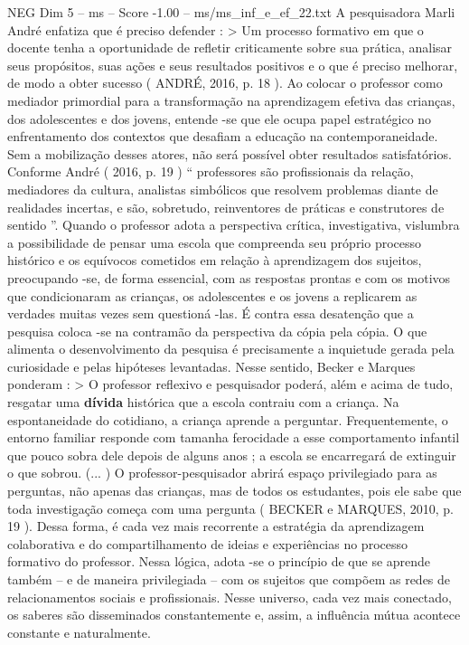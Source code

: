 \begin{textsample}{NEG Dim 5 – ms – Score -1.00 – ms/ms\_inf\_e\_ef\_22.txt}
A pesquisadora Marli André enfatiza que é preciso defender : > Um processo formativo em que o docente tenha a oportunidade de refletir criticamente sobre sua prática, analisar seus propósitos, suas ações e seus resultados positivos e o que é preciso melhorar, de modo a obter sucesso ( ANDRÉ, 2016, p. 18 ).
Ao colocar o professor como mediador primordial para a transformação na aprendizagem efetiva das crianças, dos adolescentes e dos jovens, entende -se que ele ocupa papel estratégico no enfrentamento dos contextos que desafiam a educação na contemporaneidade.
Sem a mobilização desses atores, não será possível obter resultados satisfatórios.
Conforme André ( 2016, p. 19 ) “ professores são profissionais da relação, mediadores da cultura, analistas simbólicos que resolvem problemas diante de realidades incertas, e são, sobretudo, reinventores de práticas e construtores de sentido ”.
Quando o professor adota a perspectiva crítica, investigativa, vislumbra a possibilidade de pensar uma escola que compreenda seu próprio processo histórico e os equívocos cometidos em relação à aprendizagem dos sujeitos, preocupando -se, de forma essencial, com as respostas prontas e com os motivos que condicionaram as crianças, os adolescentes e os jovens a replicarem as verdades muitas vezes sem questioná -las.
É contra essa desatenção que a pesquisa coloca -se na contramão da perspectiva da cópia pela cópia.
O que alimenta o desenvolvimento da pesquisa é precisamente a inquietude gerada pela curiosidade e pelas hipóteses levantadas.
Nesse sentido, Becker e Marques ponderam : > O professor reflexivo e pesquisador poderá, além e acima de tudo, resgatar uma \textbf{dívida} histórica que a escola contraiu com a criança.
Na espontaneidade do cotidiano, a criança aprende a perguntar.
Frequentemente, o entorno familiar responde com tamanha ferocidade a esse comportamento infantil que pouco sobra dele depois de alguns anos ; a escola se encarregará de extinguir o que sobrou. (... ) O professor-pesquisador abrirá espaço privilegiado para as perguntas, não apenas das crianças, mas de todos os estudantes, pois ele sabe que toda investigação começa com uma pergunta ( BECKER e MARQUES, 2010, p. 19 ).
Dessa forma, é cada vez mais recorrente a estratégia da aprendizagem colaborativa e do compartilhamento de ideias e experiências no processo formativo do professor.
Nessa lógica, adota -se o princípio de que se aprende também – e de maneira privilegiada – com os sujeitos que compõem as redes de relacionamentos sociais e profissionais.
Nesse universo, cada vez mais conectado, os saberes são disseminados constantemente e, assim, a influência mútua acontece constante e naturalmente.

\end{textsample}
